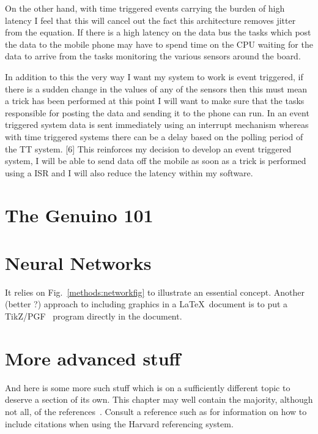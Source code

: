 On the other hand, with time triggered events carrying the burden of high latency I feel that this will cancel out the fact this architecture removes jitter from the equation. If there is a high latency on the data bus the tasks which post the data to the mobile phone may have to spend time on the CPU waiting for the data to arrive from the tasks monitoring the various sensors around the board. 

In addition to this the very way I want my system to work is event triggered, if there is a sudden change in the values of any of the sensors then this must mean a trick has been performed at this point I will want to make sure that the tasks responsible for posting the data and sending it to the phone can run. In an event triggered system data is sent immediately using an interrupt mechanism whereas with time triggered systems there can be a delay based on the polling period of the TT system. [6] This reinforces my decision to develop an event triggered system, I will be able to send data off the mobile as soon as a trick is performed using a ISR and I will also reduce the latency within my software.

\section{The Genuino 101}\label{anaylsis:genuino101}
\section{Neural Networks}\label{anaylsis:neuralnetwork}

It relies on Fig.~\ref{methods:networkfig} to illustrate an essential
concept. Another (better ?) approach to including graphics in a
\LaTeX\ document is to put a TikZ/PGF~\citep{fau:11} program directly
in the document.


\section{More advanced stuff}\label{methods:moreadvanced}
And here is some more such stuff which is on a sufficiently different
topic to deserve a section of its own. This chapter may well contain
the majority, although not all, of the
references~\citep{abr:96,acd:92,al:97}. Consult a 
reference such as \citep{lb:10} for information on how to include citations
when using the Harvard referencing system.



